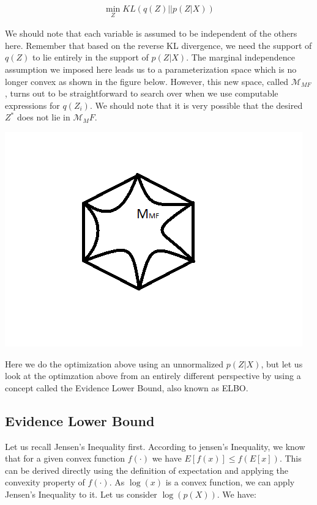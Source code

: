 \documentclass[twoside]{article}
\begin{document}
\begin{eqnarray*}
\min_{Z}{KL(q(Z)||p(Z|X))} 
\end{eqnarray*}

We should note that each variable is assumed to be independent of the others here. Remember that based on the reverse KL divergence, we need the support of $q(Z)$ to lie entirely in the support of $p(Z|X)$. The marginal independence assumption we imposed here leads us to a parameterization space which is no longer convex as shown in the figure below. However, this new space, called $\mathcal{M}_{MF}$,  turns out to be straightforward to search over when we use  computable expressions for $q(Z_i)$. We should note that it is very possible that the desired $Z^*$ does not lie in $\mathcal{M}_MF$. 

\begin{center}
\includegraphics{convexpolytope}
\end{center}

Here we do the optimization above using an unnormalized $p(Z|X)$, but let us look at the optimzation above from an entirely different perspective by using a concept called the Evidence Lower Bound, also known as ELBO. 


\subsection{Evidence Lower Bound}
Let us recall Jensen's Inequality first. According to jensen's Inequality, we know that for a given convex function $f(\cdot)$ we have $E[f(x)] \leq f(E[x])$. This can be derived directly using the definition of expectation and applying the convexity property of $f(\cdot)$. As $\log(x)$ is a convex function, we can apply Jensen's Inequality to it. Let us consider $\log(p(X))$. We have:\\
\end{document}
